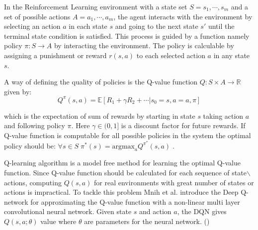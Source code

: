 In the Reinforcement Learning environment with a state set $S = s_1, \cdots, s_m$ and a  set of possible actions $A = a_1, \cdots, a_m$, the agent interacts with the environment by selecting an action $a$ in each state $s$ and going to the next state $s'$ until the terminal state condition is satisfied. This process is guided by a function namely policy $\pi : S \longrightarrow A$ by interacting the environment. The policy is calculable by assigning a punishment or reward $r(s, a)$ to each selected action $a$ in any state $s$.  

A way of defining the quality of policies is the Q-value function $Q : S \times A \longrightarrow \mathbb{R}$ given by: 
$$Q^{\pi}(s, a) = \mathbb{E}[R_1+ \gamma R_2 + \cdots | s_0 = s, a =a, \pi]$$

which is the expectation of sum of rewards by starting in state $s$ taking action $a$ and following policy $\pi$. Here $\gamma \in (0, 1]$ is a discount factor for future rewards. If Q-value function is computable for all possible policies in the system the optimal policy should be: $\forall  s \in S \; \pi^*(s) = \text{argmax}_a Q^{\pi^*}(s, a) \; $.  

Q-learning algorithm \cite{sutton1998} is a model free method for learning the optimal Q-value function. Since Q-value function should be calculated for each sequence of state$\backslash$actions, computing $Q(s, a)$ for real environments with great number of states or actions  is impractical.  To tackle this problem Mnih et al. introduce the Deep Q-network for approximating the Q-value function with a non-linear multi layer convolutional neural network.  Given state $s$ and action $a$, the DQN gives $Q(s, a; \theta)$ value where $\theta$ are parameters for the neural network. ()


